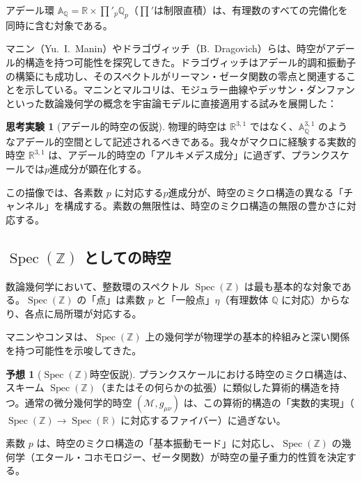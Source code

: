 \documentclass[12pt,a4paper]{ltjsarticle}
\theoremstyle{definition}
\newtheorem{conjecture}[definition]{予想}
\newtheorem{thought}[definition]{思考実験}
\newcommand{\Spec}{\operatorname{Spec}}
\begin{document}
アデール環 $\mathbb{A}_\mathbb{Q} = \mathbb{R} \times \prod'_p \mathbb{Q}_p$（$\prod'$は制限直積）は、有理数のすべての完備化を同時に含む対象である。

マニン（Yu.~I.~Manin）\cite{Manin1989}やドラゴヴィッチ（B.~Dragovich）ら\cite{Dragovich2009, Dragovich2017}は、時空がアデール的構造を持つ可能性を探究してきた。ドラゴヴィッチ\cite{Dragovich1995}はアデール的調和振動子の構築にも成功し、そのスペクトルがリーマン・ゼータ関数の零点と関連することを示している。マニンとマルコリ\cite{ManinMarcolli2014}は、モジュラー曲線やデッサン・ダンファンといった数論幾何学の概念を宇宙論モデルに直接適用する試みを展開した：

\begin{thought}[アデール的時空の仮説]
物理的時空は $\mathbb{R}^{3,1}$ ではなく、$\mathbb{A}_\mathbb{Q}^{3,1}$ のようなアデール的空間として記述されるべきである。我々がマクロに経験する実数的時空 $\mathbb{R}^{3,1}$ は、アデール的時空の「アルキメデス成分」に過ぎず、プランクスケールでは$p$進成分が顕在化する。

この描像では、各素数 $p$ に対応する$p$進成分が、時空のミクロ構造の異なる「チャンネル」を構成する。素数の無限性は、時空のミクロ構造の無限の豊かさに対応する。
\end{thought}

\subsection{$\Spec(\mathbb{Z})$ としての時空}

数論幾何学において、整数環のスペクトル $\Spec(\mathbb{Z})$ は最も基本的な対象である。$\Spec(\mathbb{Z})$ の「点」は素数 $p$ と「一般点」$\eta$（有理数体 $\mathbb{Q}$ に対応）からなり、各点に局所環が対応する。

マニン\cite{Manin1995}やコンヌ\cite{Connes1999}は、$\Spec(\mathbb{Z})$ 上の幾何学が物理学の基本的枠組みと深い関係を持つ可能性を示唆してきた。

\begin{conjecture}[$\Spec(\mathbb{Z})$時空仮説]
プランクスケールにおける時空のミクロ構造は、スキーム $\Spec(\mathbb{Z})$（またはその何らかの拡張）に類似した算術的構造を持つ。通常の微分幾何学的時空 $(\mathcal{M}, g_{\mu\nu})$ は、この算術的構造の「実数的実現」（$\Spec(\mathbb{Z}) \to \Spec(\mathbb{R})$ に対応するファイバー）に過ぎない。

素数 $p$ は、時空のミクロ構造の「基本振動モード」に対応し、$\Spec(\mathbb{Z})$ の幾何学（エタール・コホモロジー、ゼータ関数）が時空の量子重力的性質を決定する。
\end{conjecture}
\end{document}
